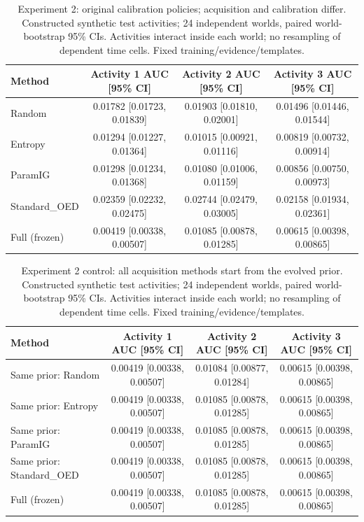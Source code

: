 \begin{table}[t]
\centering
\small
\caption{Experiment 2: original calibration policies; acquisition and calibration differ. Constructed synthetic test activities; 24 independent worlds, paired world-bootstrap 95\% CIs. Activities interact inside each world; no resampling of dependent time cells. Fixed training/evidence/templates.}
\begin{tabular}{lccc}
\toprule
Method & Activity 1 AUC [95\% CI] & Activity 2 AUC [95\% CI] & Activity 3 AUC [95\% CI] \\
\midrule
Random & 0.01782 [0.01723, 0.01839] & 0.01903 [0.01810, 0.02001] & 0.01496 [0.01446, 0.01544] \\
Entropy & 0.01294 [0.01227, 0.01364] & 0.01015 [0.00921, 0.01116] & 0.00819 [0.00732, 0.00914] \\
ParamIG & 0.01298 [0.01234, 0.01368] & 0.01080 [0.01006, 0.01159] & 0.00856 [0.00750, 0.00973] \\
Standard\_OED & 0.02359 [0.02232, 0.02475] & 0.02744 [0.02479, 0.03005] & 0.02158 [0.01934, 0.02361] \\
Full (frozen) & 0.00419 [0.00338, 0.00507] & 0.01085 [0.00878, 0.01285] & 0.00615 [0.00398, 0.00865] \\
\bottomrule
\end{tabular}
\end{table}
\begin{table}[t]
\centering
\small
\caption{Experiment 2 control: all acquisition methods start from the evolved prior. Constructed synthetic test activities; 24 independent worlds, paired world-bootstrap 95\% CIs. Activities interact inside each world; no resampling of dependent time cells. Fixed training/evidence/templates.}
\begin{tabular}{lccc}
\toprule
Method & Activity 1 AUC [95\% CI] & Activity 2 AUC [95\% CI] & Activity 3 AUC [95\% CI] \\
\midrule
Same prior: Random & 0.00419 [0.00338, 0.00507] & 0.01084 [0.00877, 0.01284] & 0.00615 [0.00398, 0.00865] \\
Same prior: Entropy & 0.00419 [0.00338, 0.00507] & 0.01085 [0.00878, 0.01285] & 0.00615 [0.00398, 0.00865] \\
Same prior: ParamIG & 0.00419 [0.00338, 0.00507] & 0.01085 [0.00878, 0.01285] & 0.00615 [0.00398, 0.00865] \\
Same prior: Standard\_OED & 0.00419 [0.00338, 0.00507] & 0.01085 [0.00878, 0.01285] & 0.00615 [0.00398, 0.00865] \\
Full (frozen) & 0.00419 [0.00338, 0.00507] & 0.01085 [0.00878, 0.01285] & 0.00615 [0.00398, 0.00865] \\
\bottomrule
\end{tabular}
\end{table}
